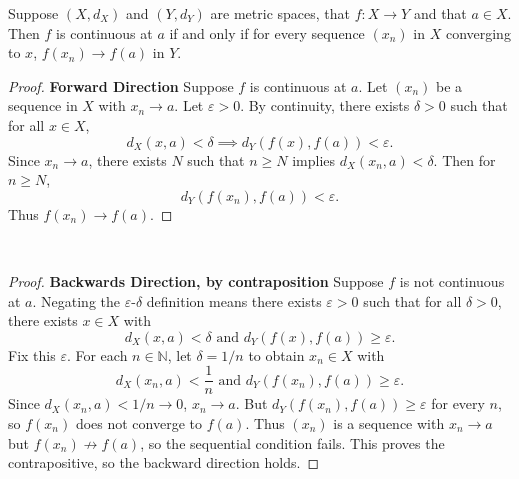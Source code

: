 \documentclass[minion]{homework}
\newcommand{\Nats}{\ensuremath{\mathbb N}} %
\begin{document}
\begin{problems}
Suppose $(X,d_X)$ and $(Y, d_Y)$ are metric spaces, that
$f:X\to Y$ and that $a\in X$. Then $f$ is continuous at $a$ if and
only if for every sequence $(x_n)$ in $X$ converging to $x$, $f(x_n)\to f(a)$
in $Y$. \newline
\begin{proof} \textbf{Forward Direction} \newline
  Suppose $f$ is continuous at $a$. Let $(x_n)$ be a sequence in $X$ with $x_n \to a$. Let $\varepsilon > 0$. By continuity, there exists $\delta > 0$ such that for all $x \in X$,
  $$d_X(x,a) < \delta \implies d_Y(f(x),f(a)) < \varepsilon.$$
  Since $x_n \to a$, there exists $N$ such that $n \geq N$ implies $d_X(x_n,a) < \delta$. Then for $n \geq N$,
  $$d_Y(f(x_n),f(a)) < \varepsilon.$$
  Thus $f(x_n) \to f(a)$.
\end{proof}$ $
\begin{proof} \textbf{Backwards Direction, by contraposition}
  Suppose $f$ is not continuous at $a$. Negating the $\varepsilon$-$\delta$ definition means there exists $\varepsilon > 0$ such that for all $\delta > 0$, there exists $x \in X$ with
  $$d_X(x,a) < \delta \text{ and } d_Y(f(x),f(a)) \geq \varepsilon.$$
  Fix this $\varepsilon$. For each $n \in \Nats$, let $\delta = 1/n$ to obtain $x_n \in X$ with
  $$d_X(x_n,a) < \frac1n \text{ and } d_Y(f(x_n),f(a)) \geq \varepsilon.$$
  Since $d_X(x_n,a) < 1/n \to 0$, $x_n \to a$. But $d_Y(f(x_n),f(a)) \geq \varepsilon$ for every $n$, so $f(x_n)$ does not converge to $f(a)$.
  Thus $(x_n)$ is a sequence with $x_n \to a$ but $f(x_n) \not\to f(a)$, so the sequential condition fails. This proves the contrapositive, so the backward direction holds.
\end{proof}


\end{problems}
\end{document}
